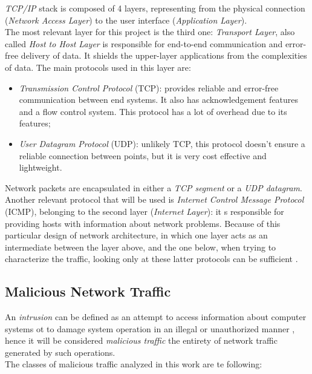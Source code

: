 \textit{TCP/IP} stack is composed of 4 layers, representing from the physical connection (\textit{Network Access Layer}) to the user interface (\textit{Application Layer}). \\ The most relevant layer for this project is the third one: \textit{Transport Layer}, also called \textit{Host to Host Layer} is responsible for end-to-end communication and error-free delivery of data. It shields the upper-layer applications from the complexities of data. The main protocols used in this layer are:

\begin{itemize}
    \item[\faCaretRight] \textit{Transmission Control Protocol} (TCP): provides reliable and error-free communication between end systems. It also has acknowledgement features and a flow control system. This protocol has a lot of overhead due to its features;
    \item[\faCaretRight] \textit{User Datagram Protocol} (UDP): unlikely TCP, this protocol doesn't ensure a reliable connection between points, but it is very cost effective and lightweight.
\end{itemize}
Network packets are encapsulated in either a \textit{TCP segment} or a \textit{UDP datagram}. Another relevant protocol that will be used is \textit{Internet Control Message Protocol} (ICMP), belonging to the second layer (\textit{Internet Layer}): it s responsible for providing hosts with information about network problems. Because of this particular design of network architecture, in which one layer acts as an intermediate between the layer above, and the one below, when trying to characterize the traffic, looking only at these latter protocols can be sufficient \cite{Iglesias2015}.


\subsection{Malicious Network Traffic}
\label{subsec:malicious-traffic}

An \textit{intrusion} can be defined as an attempt to access information about computer systems ot to damage system operation in an illegal or unauthorized manner \cite{Liu2019}, hence it will be considered \textit{malicious traffic} the entirety of network traffic generated by such operations. \\
The classes of malicious traffic analyzed in this work are te following:

